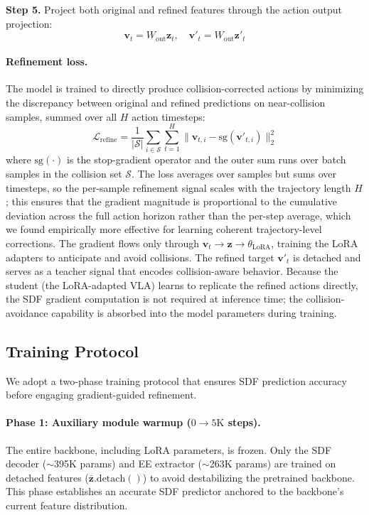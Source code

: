 \textbf{Step 5.} Project both original and refined features through the action output projection:
\begin{equation}\label{eq:projection}
\mathbf{v}_t = W_\mathrm{out} \mathbf{z}_t, \quad \mathbf{v}'_t = W_\mathrm{out} \mathbf{z}'_t
\end{equation}

\paragraph{Refinement loss.} The model is trained to directly produce collision-corrected actions by minimizing the discrepancy between original and refined predictions on near-collision samples, summed over all $H$ action timesteps:
\begin{equation}\label{eq:loss_refine}
\mathcal{L}_\mathrm{refine} = \frac{1}{|\mathcal{S}|} \sum_{i \in \mathcal{S}} \sum_{t=1}^{H} \|\mathbf{v}_{t,i} - \mathrm{sg}(\mathbf{v}'_{t,i})\|_2^2
\end{equation}
where $\mathrm{sg}(\cdot)$ is the stop-gradient operator and the outer sum runs over batch samples in the collision set $\mathcal{S}$. The loss averages over samples but sums over timesteps, so the per-sample refinement signal scales with the trajectory length $H$; this ensures that the gradient magnitude is proportional to the cumulative deviation across the full action horizon rather than the per-step average, which we found empirically more effective for learning coherent trajectory-level corrections. The gradient flows only through $\mathbf{v}_t \to \mathbf{z} \to \theta_\mathrm{LoRA}$, training the LoRA adapters to anticipate and avoid collisions. The refined target $\mathbf{v}'_t$ is detached and serves as a teacher signal that encodes collision-aware behavior. Because the student (the LoRA-adapted VLA) learns to replicate the refined actions directly, the SDF gradient computation is not required at inference time; the collision-avoidance capability is absorbed into the model parameters during training.

\subsection{Training Protocol}\label{sec:training}

We adopt a two-phase training protocol that ensures SDF prediction accuracy before engaging gradient-guided refinement.

\paragraph{Phase 1: Auxiliary module warmup ($0 \to 5\mathrm{K}$ steps).} The entire backbone, including LoRA parameters, is frozen. Only the SDF decoder (${\sim}$395K params) and EE extractor (${\sim}$263K params) are trained on detached features ($\bar{\mathbf{z}}.\mathrm{detach}()$) to avoid destabilizing the pretrained backbone. This phase establishes an accurate SDF predictor anchored to the backbone's current feature distribution.


